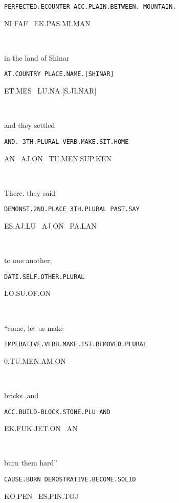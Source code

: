 {{\tt PERFECTED.ECOUNTER  	ACC.PLAIN.BETWEEN. MOUNTAIN.	}

NI.FAF~                                EK.PAS.MI.MAN 

\Atlanni\faf~\ek\pas\mi\man


\drie  

in the land          of Shinar 

{\tt AT.COUNTRY	PLACE.NAME.[SHINAR] }

ET.MES~		LU.NA.[S.JI.NAR] 

\et\mes~\lu\na{}

\drie


and 	they 		settled			 

{\tt AND.	3TH.PLURAL	VERB.MAKE.SIT.HOME	 }

AN~	AJ.ON~   TU.MEN.SUP.KEN 

\an~\aj\on~\tu\men\Atlansup\ken

\drie
  

There.			they		said 	 

{\tt DEMONST.2ND.PLACE	3TH.PLURAL	PAST.SAY }

ES.AJ.LU~		AJ.ON~		PA.LAN	 

\es\aj\lu~\period \aj\on~\pa\lan

\drie 

to one another, 			 

{\tt DATI.SELF.OTHER.PLURAL		 }

LO.SU.OF.ON 

\lo\su\of\on\

\drie 



  

“come, let us make   

{\tt IMPERATIVE.VERB.MAKE.1ST.REMOVED.PLURAL }

0.TU.MEN.AM.ON 

\Atlano\tu\men\am\on\

\drie 

 

bricks			,and 	 

{\tt ACC.BUILD-BLOCK.STONE.PLU 	AND		 }

EK.FUK.JET.ON~			AN 

\ek\fuk\jet\on~\an\


  

burn them			hard” 

{\tt CAUSE.BURN 			DEMOSTRATIVE.BECOME.SOLID }

KO.PEN~    ES.PIN.TOJ				 

}
